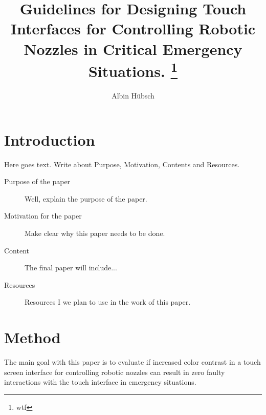 \documentclass[runningheads,a4paper,oribibl]{llncs}
\begin{document}
\pagestyle{headings}

\mainmatter

\title{Guidelines for Designing Touch Interfaces for Controlling Robotic Nozzles in Critical Emergency Situations. \thanks{wtf}}


\author{Albin Hübsch}


\maketitle

%
%

\section{Introduction}
Here goes text. Write about Purpose, Motivation, Contents and Resources.

\begin{description}
	\item[Purpose of the paper] Well, explain the purpose of the paper.
	\item[Motivation for the paper] Make clear why this paper needs to be done.
	\item[Content] The final paper will include...
	\item[Resources] Resources I we plan to use in the work of this paper.
\end{description}

\section{Method}
The main goal with this paper is to evaluate if increased color contrast in a touch screen interface for controlling robotic nozzles can result in zero faulty interactions with the touch interface in emergency situations.
\end{document}

